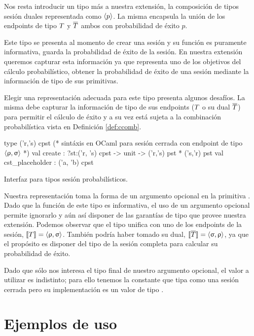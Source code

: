 \label{cap:comp_sesiones_duales}
Nos resta introducir un tipo más a nuestra extensión, la composición de tipos
sesión duales representada como $\langle p \rangle$. La misma encapsula la
unión de los endpoints de tipo $T$ y $\overline{T}$ ambos con probabilidad de éxito
$p$.

Este tipo se presenta al momento de crear una sesión y su función es puramente
informativa, guarda la probabilidad de éxito de la sesión. En nuestra extensión
queremos capturar esta información ya que representa uno de los objetivos del
cálculo probabilístico, obtener la probabilidad de éxito de una sesión mediante
la información de tipo de sus primitivas.

Elegir una representación adecuada para este tipo presenta algunos desafíos.
La misma debe capturar la información de tipo de sus endpoints ($T$ o su
dual $\overline{T}$) para permitir el cálculo de éxito y a su vez está sujeta a la
combinación probabilística vista en Definición \ref{def:ccomb}.

\begin{table}[htb]
	\begin{OCamlD}[frame=single]
  type ('r,'s) cpst (* sintáxis en OCaml para sesión cerrada
                     con endpoint de tipo $\langle\uprho,\upsigma\rangle$ *)
  val create  : ?st:('r, 's) cpst -> unit -> ('r,'s) pst * ('s,'r) pst
  val cst_placeholder : ('a, 'b) cpst
	\end{OCamlD}
	\caption{Interfaz \OCaml para tipos sesión probabilísticos.}
	\label{tab:create_cpst_sig}
\end{table}

Nuestra representación toma la forma de un argumento opcional en la primitiva
. Dado que la función de este tipo es informativa, el uso de un
argumento opcional permite ignorarlo y aún así disponer de las garantías de
tipo que provee nuestra extensión. Podemos observar que el tipo unifica con uno
de los endpoints de la sesión, $\llbracket T\rrbracket = \langle\uprho,\upsigma\rangle$. También
podría haber tomado su dual, $\llbracket\overline{T}\rrbracket = \langle\upsigma,\uprho\rangle$, ya que
el propósito es disponer del tipo de la sesión completa para calcular su
probabilidad de éxito.

Dado que sólo nos interesa el tipo final de nuestro argumento opcional, el
valor a utilizar es indistinto; para ello tenemos la constante
 que tipa como una sesión cerrada pero su implementación es
un valor de tipo .

\section{Ejemplos de uso}

